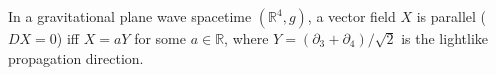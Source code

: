 In a gravitational plane wave spacetime $(\mathbb{R}^4, g)$, a vector field $X$ is parallel ($DX = 0$) iff $X = aY$ for some $a \in \mathbb{R}$, where $Y = (\partial_3 + \partial_4)/\sqrt{2}$ is the lightlike propagation direction.
